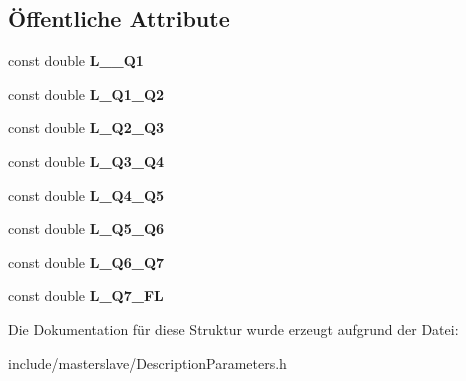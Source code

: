 \subsection*{Öffentliche Attribute}
\begin{DoxyCompactItemize}
\item 
\hypertarget{structlbrDescriptionParameters_a70c50b164fcca4c27ec244a83714f6f3}{const double {\bfseries L\-\_\-\_\-\-Q1}}\label{structlbrDescriptionParameters_a70c50b164fcca4c27ec244a83714f6f3}

\item 
\hypertarget{structlbrDescriptionParameters_af73f716fc6eaabf5ec13e07fa4f1eee3}{const double {\bfseries L\-\_\-\-Q1\-\_\-\-Q2}}\label{structlbrDescriptionParameters_af73f716fc6eaabf5ec13e07fa4f1eee3}

\item 
\hypertarget{structlbrDescriptionParameters_aad77a7879ffd39d37b3b6ee4915fd682}{const double {\bfseries L\-\_\-\-Q2\-\_\-\-Q3}}\label{structlbrDescriptionParameters_aad77a7879ffd39d37b3b6ee4915fd682}

\item 
\hypertarget{structlbrDescriptionParameters_ab34af085c26de98917c9a5cf7299c0b0}{const double {\bfseries L\-\_\-\-Q3\-\_\-\-Q4}}\label{structlbrDescriptionParameters_ab34af085c26de98917c9a5cf7299c0b0}

\item 
\hypertarget{structlbrDescriptionParameters_a80b3afbe09aa3c9837e6fd86f9036eb4}{const double {\bfseries L\-\_\-\-Q4\-\_\-\-Q5}}\label{structlbrDescriptionParameters_a80b3afbe09aa3c9837e6fd86f9036eb4}

\item 
\hypertarget{structlbrDescriptionParameters_a16e9ac758d9e1d7210133e69f7f1157d}{const double {\bfseries L\-\_\-\-Q5\-\_\-\-Q6}}\label{structlbrDescriptionParameters_a16e9ac758d9e1d7210133e69f7f1157d}

\item 
\hypertarget{structlbrDescriptionParameters_a6c3087fb2839875c17c28275b5e411b0}{const double {\bfseries L\-\_\-\-Q6\-\_\-\-Q7}}\label{structlbrDescriptionParameters_a6c3087fb2839875c17c28275b5e411b0}

\item 
\hypertarget{structlbrDescriptionParameters_a417e5478d67dedb0feea59594d531683}{const double {\bfseries L\-\_\-\-Q7\-\_\-\-F\-L}}\label{structlbrDescriptionParameters_a417e5478d67dedb0feea59594d531683}

\end{DoxyCompactItemize}


Die Dokumentation für diese Struktur wurde erzeugt aufgrund der Datei\-:\begin{DoxyCompactItemize}
\item 
include/masterslave/Description\-Parameters.\-h\end{DoxyCompactItemize}
